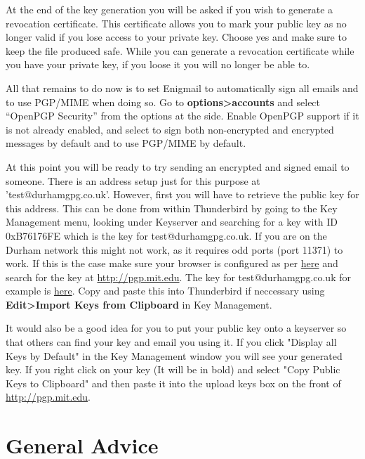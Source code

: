 \begin{compactenum}[1.]
    \item At the end of the key generation you will be asked if you wish to generate a revocation certificate. This certificate allows you to mark your public key as no longer valid if you lose access to your private key. Choose yes and make sure to keep the file produced safe. While you can generate a revocation certificate while you have your private key, if you loose it you will no longer be able to.
    \item All that remains to do now is to set Enigmail to automatically sign all emails and to use PGP/MIME when doing so. Go to \textbf{options>accounts} and select ``OpenPGP Security'' from the options at the side. Enable OpenPGP support if it is not already enabled, and select to sign both non-encrypted and encrypted messages by default and to use PGP/MIME by default.
    \item At this point you will be ready to try sending an encrypted and signed email to someone. There is an address setup just for this purpose at 'test@durhamgpg.co.uk'. However, first you will have to retrieve the public key for this address. This can be done from within Thunderbird by going to the Key Management menu, looking under Keyserver and searching for a key with ID 0xB76176FE which is the key for test@durhamgpg.co.uk. If you are on the Durham network this might not work, as it requires odd ports (port 11371) to work. If this is the case make sure your browser is configured as per \href{http://durhamgpg.co.uk/ffproxy.png}{here} and search for the key at \href{http://pgp.mit.edu}{http://pgp.mit.edu}. The key for test@durhamgpg.co.uk for example is \href{http://pgp.mit.edu:11371/pks/lookup?op=get&search=0x773B90C7B76176FE}{here}. Copy and paste this into Thunderbird if neccessary using \textbf{Edit>Import Keys from Clipboard} in Key Management.
    \item It would also be a good idea for you to put your public key onto a keyserver so that others can find your key and email you using it. If you click "Display all Keys by Default" in the Key Management window you will see your generated key. If you right click on your key (It will be in bold) and select "Copy Public Keys to Clipboard" and then paste it into the upload keys box on the front of \href{http://pgp.mit.edu}{http://pgp.mit.edu}.
\end{compactenum}

\section{General Advice}

